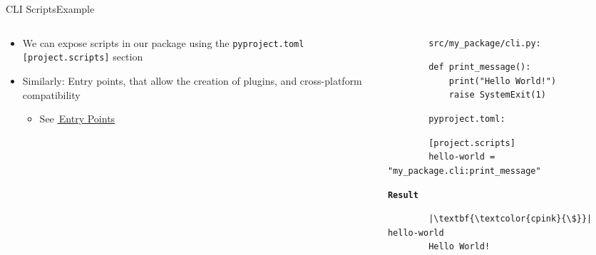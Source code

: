 \begin{splitframe}[fragile]{CLI Scripts}{Example}
  \begin{columns}[t,onlytextwidth]
    \begin{column}{0.58\textwidth}
      \begin{itemize}
        \setlength{\itemsep}{1em}
        \item We can expose scripts in our package using the \texttt{pyproject.toml}
          \texttt{[project.scripts]} section
        \item Similarly: Entry points, that allow the creation of plugins, and cross-platform
          compatibility
          \begin{itemize}
            \item [\textcolor{cpink}{\to}] See \href{https://setuptools.pypa.io/en/latest/userguide/entry_point.html}{{\footnotesize{\faExternalLink*}}\,Entry Points}
          \end{itemize}
      \end{itemize}
    \end{column}
    \hfill
    \begin{column}{0.38\textwidth}
      \begin{verbatim}
        src/my_package/cli.py:
      \end{verbatim}
      \vspace{0.25em}
      \begin{verbatim}
        def print_message():
            print("Hello World!")
            raise SystemExit(1)
      \end{verbatim}
      \vspace{1em}
      \begin{verbatim}
        pyproject.toml:
      \end{verbatim}
      \vspace{0.25em}
      \begin{verbatim}
        [project.scripts]
        hello-world = "my_package.cli:print_message"
      \end{verbatim}
      \vspace{1em}
      \begin{center}
        \huge\textcolor{cpink}{\texttt{\textbf{Result}}}
      \end{center}
      \begin{verbatim}
        |\textbf{\textcolor{cpink}{\$}}| hello-world
        Hello World!
      \end{verbatim}
    \end{column}
  \end{columns}
\end{splitframe}


